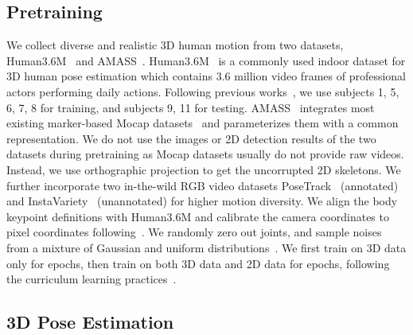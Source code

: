 \subsection{Pretraining}
\label{Sec:exp-pretrain}
We collect diverse and realistic 3D human motion from two datasets, Human3.6M~\cite{h36m_pami} and AMASS~\cite{AMASS:2019}. Human3.6M~\cite{h36m_pami} is a commonly used indoor dataset for 3D human pose estimation which contains 3.6 million video frames of professional actors performing daily actions. Following previous works~\cite{martinez_2017_3dbaseline, pavllo20193d}, we use subjects 1, 5, 6, 7, 8 for training, and subjects 9, 11 for testing. AMASS~\cite{AMASS:2019} integrates most existing marker-based Mocap datasets~\cite{ACCAD, DanceDB:Aristidou:2019, BMLhandball, BMLrub, cmuWEB, dfaust:CVPR:2017, Eyes_Japan, ghorbani2020movi, chatzitofis2020human4d, HEva_Sigal:IJCV:10b, KIT_Dataset, MoSh_lopermahmoodetal2014, MPI_HDM05, PosePrior_Akhter:CVPR:2015, TCD_hands, DBLP:conf/bmvc/TrumbleGMHC17} and parameterizes them with a common representation. We do not use the images or 2D detection results of the two datasets during pretraining as Mocap datasets usually do not provide raw videos. Instead, we use orthographic projection to get the uncorrupted 2D skeletons. We further incorporate two in-the-wild RGB video datasets PoseTrack~\cite{PoseTrack} (annotated) and InstaVariety~\cite{humanMotionKanazawa19} (unannotated) for higher motion diversity. We align the body keypoint definitions with Human3.6M and calibrate the camera coordinates to pixel coordinates following~\cite{lcn-pami}. We randomly zero out  joints, and sample noises from a mixture of Gaussian and uniform distributions~\cite{chang2019poselifter}. We first train on 3D data only for  epochs, then train on both 3D data and 2D data for  epochs, following the curriculum learning practices~\cite{bengio2009icml, 9392296}.








\subsection{3D Pose Estimation}


